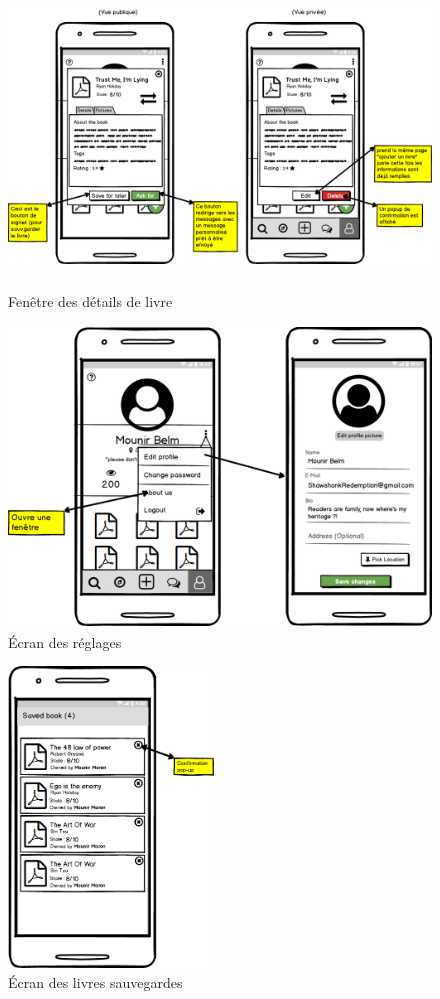 \begin{figure}[H]
	\begin{center}
		\includegraphics[height=8cm]{Images/chapter3/wireframe/displaying_a_book_details.png}
		\caption{{\footnotesize Fenêtre des détails de livre}}
	\end{center}
\end{figure}

\begin{figure}[H]
	\centering
		\includegraphics[height=8cm]{Images/chapter3/wireframe/settings.png}
		\caption{{\footnotesize Écran des réglages}}
\end{figure}

\begin{figure}[H]
	\centering
		\includegraphics[height=8cm]{Images/chapter3/wireframe/saved_for_later.png}
		\caption{{\footnotesize Écran des livres sauvegardes}}
\end{figure}

